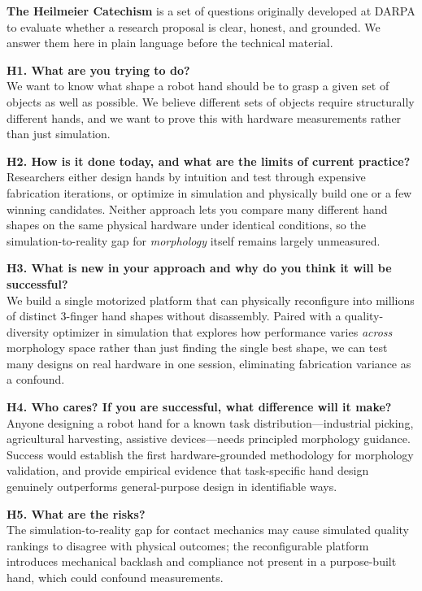 \documentclass[journal]{IEEEtran}
\begin{document}
\begin{heilbox}
\textbf{The Heilmeier Catechism} is a set of questions originally developed at DARPA to
evaluate whether a research proposal is clear, honest, and grounded.
We answer them here in plain language before the technical material.

\smallskip
\textbf{H1. What are you trying to do?}\\
We want to know what shape a robot hand should be to grasp a given set of objects as well
as possible.
We believe different sets of objects require structurally different hands, and we want to
prove this with hardware measurements rather than just simulation.

\smallskip
\textbf{H2. How is it done today, and what are the limits of current practice?}\\
Researchers either design hands by intuition and test through expensive fabrication iterations,
or optimize in simulation and physically build one or a few winning candidates.
Neither approach lets you compare many different hand shapes on the same physical hardware
under identical conditions, so the simulation-to-reality gap for \emph{morphology} itself
remains largely unmeasured.

\smallskip
\textbf{H3. What is new in your approach and why do you think it will be successful?}\\
We build a single motorized platform that can physically reconfigure into millions of
distinct 3-finger hand shapes without disassembly.
Paired with a quality-diversity optimizer in simulation that explores how performance
varies \emph{across} morphology space rather than just finding the single best shape,
we can test many designs on real hardware in one session, eliminating fabrication variance
as a confound.

\smallskip
\textbf{H4. Who cares? If you are successful, what difference will it make?}\\
Anyone designing a robot hand for a known task distribution---industrial picking,
agricultural harvesting, assistive devices---needs principled morphology guidance.
Success would establish the first hardware-grounded methodology for morphology validation,
and provide empirical evidence that task-specific hand design genuinely outperforms
general-purpose design in identifiable ways.

\smallskip
\textbf{H5. What are the risks?}\\
The simulation-to-reality gap for contact mechanics may cause simulated quality rankings
to disagree with physical outcomes; the reconfigurable platform introduces mechanical
backlash and compliance not present in a purpose-built hand, which could confound measurements.


\end{heilbox}
\end{document}
